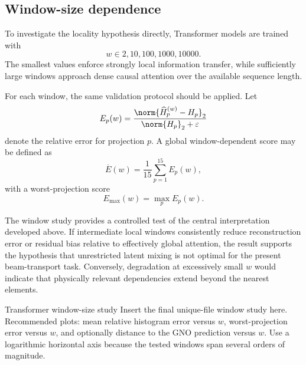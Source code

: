 \subsection{Window-size dependence}
\label{subsec:results_window_study}

To investigate the locality hypothesis directly, Transformer models are trained with
\begin{equation}
w
\in
{
2,
10,
100,
1000,
10000
}.
\label{eq:window_values_study}
\end{equation}
The smallest values enforce strongly local information transfer, while sufficiently large windows approach dense causal attention over the available sequence length.

For each window, the same validation protocol should be applied. Let
\begin{equation}
E_p(w)
=
\frac{
\norm{
\widehat{H}_{p}^{(w)}
-
H_p
}_2
}{
\norm{
H_p
}_2
+
\varepsilon
}
\label{eq:window_relative_error}
\end{equation}
denote the relative error for projection \(p\). A global window-dependent score may be defined as
\begin{equation}
\overline{E}(w)
=
\frac{1}{15}
\sum_{p=1}^{15}
E_p(w),
\label{eq:window_mean_error}
\end{equation}
with a worst-projection score
\begin{equation}
E_{\max}(w)
=
\max_{p}
E_p(w).
\label{eq:window_max_error}
\end{equation}

The window study provides a controlled test of the central interpretation developed above. If intermediate local windows consistently reduce reconstruction error or residual bias relative to effectively global attention, the result supports the hypothesis that unrestricted latent mixing is not optimal for the present beam-transport task. Conversely, degradation at excessively small \(w\) would indicate that physically relevant dependencies extend beyond the nearest elements.

\placeholderfigure
{Transformer window-size study}
{Insert the final unique-file window study here. Recommended plots: mean relative histogram error versus \(w\), worst-projection error versus \(w\), and optionally distance to the GNO prediction versus \(w\). Use a logarithmic horizontal axis because the tested windows span several orders of magnitude.}
